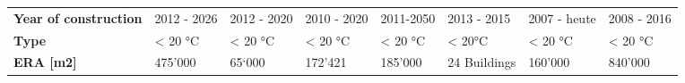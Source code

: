 \begin{landscape}
\begin{table}[h]
\begin{tabular}{llllllll}
\textbf{Year of construction}                                                  & 2012 - 2026                                                                        & 2012 - 2020                                                                 & 2010 - 2020                                                                                           & 2011-2050                                                                         & 2013 - 2015                                                              & 2007 - heute                                                          & 2008 - 2016                                                                   \\
\textbf{Type}                                                                  & < 20 \si{\celsius}                                                                            & < 20 \si{\celsius}                                                                     & < 20 \si{\celsius}                                                                                               & < 20 \si{\celsius}                                                                           & < 20\si{\celsius}                                                                   & < 20 \si{\celsius}                                                               & < 20 \si{\celsius}                                                                       \\
\textbf{ERA [m2]}                                                              & 475'000                                                                            & 65‘000                                                                      & 172'421                                                                                               & 185'000                                                                           & 24 Buildings                                                             & 160'000                                                               & 840'000                                                                       \\

\end{tabular}
\end{table}
\end{landscape}
